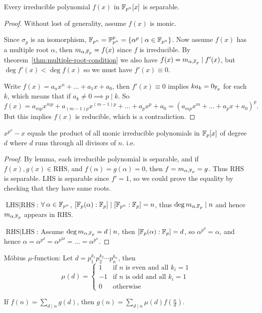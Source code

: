 \begin{lemma}
  Every irreducible polynomial $f(x)$ in $\mathbb{F}_{p^n}[x]$ is separable.

  \begin{proof}
    Without lost of generality, assume $f(x)$ is monic.

    Since $\sigma_p$ is an isomorphism, $\mathbb{F}_{p^n} = \mathbb{F}_{p^n}^p = \{ \alpha^p \mid \alpha \in \mathbb{F}_{p^n}\}$.
    Now assume $f(x)$ has a multiple root $\alpha$, then $m_{\alpha, \mathbb{F}_p} = f(x)$ since $f$
    is irreducible. By theorem~\ref{thm:multiple-root-condition} we also have
    $f(x) = m_{\alpha, \mathbb{F}_p} \mid f'(x)$, but $\deg f'(x) < \deg f(x)$ so we must have $f'(x) \equiv 0$.

    Write $f(x) = a_n x^n + \ldots + a_1 x + a_0$, then $f'(x) \equiv 0$ implies $k a_k = 0_{\mathbb{F}_p}$ for each $k$,
    which means that if $a_k \neq 0 \implies p \mid k$. So
    \[ f(x) = a_{mp} x^{mp} + a_{(m-1)p} x^{(m-1)p} + \dots + a_p x^p + a_0 =
    (a_{mp} x^m + \ldots + a_p x + a_0)^p. \]
    But this implies $f(x)$ is reducible, which is a contradiction.
  \end{proof}
\end{lemma}

\begin{theorem}
  $x^{p^n} - x$ equals the product of all monic irreducible polynomials in
  $\mathbb{F}_p[x]$ of degree $d$ where $d$ runs through all divisors of $n$. i.e.

  \begin{proof}
    By lemma, each irreducible polynomial is separable, and if $f(x), g(x) \in \text{RHS}$,
    and $f(\alpha) = g(\alpha) = 0$, then $f = m_{\alpha, \mathbb{F}_p} = g$. Thus RHS is separable.
    LHS is separable since $f' = 1$, so we could prove the equality by checking that
    they have same roots.

    $\text{LHS} \mid \text{RHS}$: $\forall \alpha \in \Fb_{p^n}$,
    $[\mathbb{F}_p(\alpha): \mathbb{F}_p] \mid [\mathbb{F}_{p^n}: \mathbb{F}_p] = n$, thus $\deg m_{\alpha, \mathbb{F}_p} \mid n$
    and hence $m_{\alpha, \mathbb{F}_p}$ appears in RHS.

    $\text{RHS} \mid \text{LHS}$: Assume $\deg m_{\alpha, \mathbb{F}_p} = d \mid n$, then
    $[\mathbb{F}_p(\alpha): \mathbb{F}_p] = d$, so $\alpha^{p^d} = \alpha$, and hence
    $\alpha = \alpha^{p^d} = \alpha^{p^{2d}} = \dots = \alpha^{p^n}$.
  \end{proof}
\end{theorem}

\begin{definition}
  M\"{o}bius $\mu$-function:
  Let $d = p_1^{k_1} p_2^{k_2} \dotsm p_n^{k_n}$, then
  \[
    \mu(d) = \begin{cases}
      1 & \text{if $n$ is even and all $k_i = 1$} \\
      -1 & \text{if $n$ is odd and all $k_i = 1$} \\
      0 & \text{otherwise}
    \end{cases}
  \]
\end{definition}

\begin{theorem}
  If $f(n) = \sum\limits_{d \mid n} g(d)$, then
  $g(n) = \sum\limits_{d \mid n} \mu(d) f\left(\frac{n}{d}\right)$.
\end{theorem}
